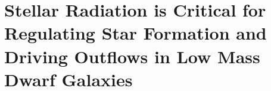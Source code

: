 \chapter[Stellar Radiation is Critical for Regulating Star Formation and Driving Outflows in Low Mass Dwarf Galaxies]{Stellar Radiation is Critical for Regulating Star Formation and Driving Outflows in Low Mass Dwarf Galaxies \label{ch:chapter2}}
\begingroup
\let\thefootnote\relax{}
\endgroup
%
%
%

